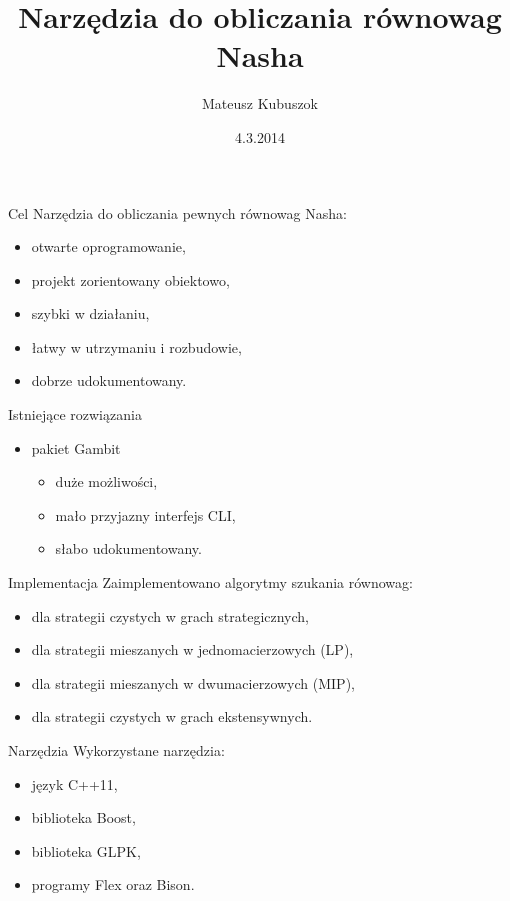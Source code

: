 \documentclass{beamer}
\title[Narzędzia do równowag Nasha]{Narzędzia do obliczania równowag Nasha}
\author[M. Kubuszok]{Mateusz Kubuszok}
\institute[Politechnika Wrocławska]{
  Promotor\\
  Dr inż. Piotr Więcek\\[1ex]
}
\date[Marzec 2014]{4.3.2014}
\begin{document}
\begin{frame}[plain]
  \titlepage
\end{frame}

\begin{frame}{Cel}
Narzędzia do obliczania pewnych równowag Nasha:
\begin{itemize}
\item otwarte oprogramowanie,
\item projekt zorientowany obiektowo,
\item szybki w działaniu,
\item łatwy w utrzymaniu i rozbudowie,
\item dobrze udokumentowany.
\end{itemize}
\end{frame}

\begin{frame}{Istniejące rozwiązania}
\begin{itemize}

\item pakiet Gambit
\begin{itemize}
\item duże możliwości,
\item mało przyjazny interfejs CLI,
\item słabo udokumentowany.
\end{itemize}

\end{itemize}
\end{frame}

\begin{frame}{Implementacja}
Zaimplementowano algorytmy szukania równowag:
\begin{itemize}
\item dla strategii czystych w grach strategicznych,
\item dla strategii mieszanych w jednomacierzowych (LP),
\item dla strategii mieszanych w dwumacierzowych (MIP),
\item dla strategii czystych w grach ekstensywnych.
\end{itemize}
\end{frame}

\begin{frame}{Narzędzia}
Wykorzystane narzędzia:
\begin{itemize}
\item język C++11,
\item biblioteka Boost,
\item biblioteka GLPK,
\item programy Flex oraz Bison.
\end{itemize}
\end{frame}
\end{document}
